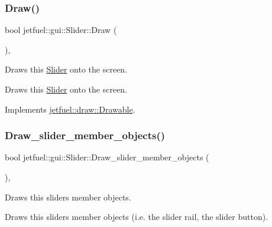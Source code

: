 \subsubsection{\texorpdfstring{Draw()}{Draw()}}
{\footnotesize\ttfamily bool jetfuel\+::gui\+::\+Slider\+::\+Draw (\begin{DoxyParamCaption}{ }\end{DoxyParamCaption})\hspace{0.3cm}{\ttfamily [override]}, {\ttfamily [virtual]}}



Draws this \hyperlink{classjetfuel_1_1gui_1_1Slider}{Slider} onto the screen. 

Draws this \hyperlink{classjetfuel_1_1gui_1_1Slider}{Slider} onto the screen. 

Implements \hyperlink{classjetfuel_1_1draw_1_1Drawable_a1a072070322965ce9411ee6e7c311c56}{jetfuel\+::draw\+::\+Drawable}.

\mbox{\label{classjetfuel_1_1gui_1_1Slider_a730d18fe513120406907380b7caf3280}} 
\subsubsection{\texorpdfstring{Draw\+\_\+slider\+\_\+member\+\_\+objects()}{Draw\_slider\_member\_objects()}}
{\footnotesize\ttfamily bool jetfuel\+::gui\+::\+Slider\+::\+Draw\+\_\+slider\+\_\+member\+\_\+objects (\begin{DoxyParamCaption}{ }\end{DoxyParamCaption})\hspace{0.3cm}{\ttfamily [inline]}, {\ttfamily [protected]}}



Draws this slider\textquotesingle{}s member objects. 

Draws this slider\textquotesingle{}s member objects (i.\+e. the slider rail, the slider button). \mbox{\label{classjetfuel_1_1gui_1_1Slider_a65b6eea54c4b4b78d0522b9eda83db0b}} 
